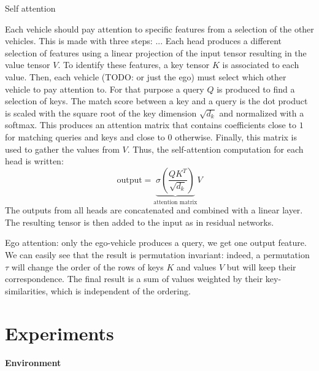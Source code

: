 \documentclass{article}
\begin{document}
{%

Self attention

Each vehicle should pay attention to specific features from a selection of the other vehicles.
This is made with three steps: ...
Each head produces a different selection of features using a linear projection of
the input tensor resulting in the value tensor $V$.
To identify these features, a key tensor $K$ is associated to each value.
Then, each vehicle (TODO: or just the ego) must select which other vehicle to pay attention to.
For that purpose a query $Q$ is produced to find a selection of keys.
The match score between a key and a query is the dot product is scaled with the square root of the key
dimension $\sqrt{d_k}$ and normalized with a softmax.
This produces an attention matrix that contains coefficients close to $1$ for matching queries and keys
and close to $0$ otherwise.
Finally, this matrix is used to gather the values from $V$.
Thus, the self-attention computation for each head is written:
\begin{equation}
\text{output}=\underbrace{\sigma\left(\frac{QK^T}{\sqrt{d_k}}\right)}_{\text{attention matrix}}V
\label{eq_selfattention}
\end{equation}
The outputs from all heads are concatenated and combined with a linear layer.
The resulting tensor is then added to the input as in residual networks.

Ego attention: only the ego-vehicle produces a query, we get one output feature. We can easily see that the result is permutation invariant: indeed, a permutation $\tau$ will change the order of the rows of keys $K$ and values $V$ but will keep their correspondence. The final result is a sum of values weighted by their key-similarities, which is independent of the ordering. %

\section{Experiments}
\paragraph{Environment}

}
\end{document}
